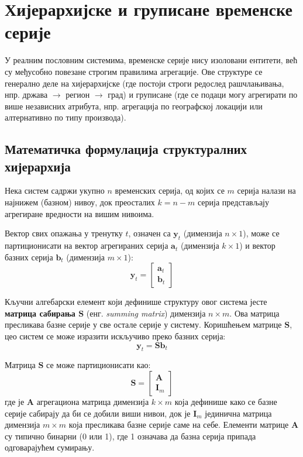 \documentclass[12pt,oneside]{memoir}
\begin{document}
\section{Хијерархијске и груписане временске серије}

У реалним пословним системима, временске серије нису изоловани ентитети, већ су међусобно повезане строгим правилима агрегације. Ове структуре се генерално деле на хијерархијске (где постоји строги редослед рашчлањивања, нпр. држава $\rightarrow$ регион $\rightarrow$ град) и груписане (где се подаци могу агрегирати по више независних атрибута, нпр. агрегација по географској локацији или алтернативно по типу производа).

\subsection{Математичка формулација структуралних хијерархија}

Нека систем садржи укупно $n$ временских серија, од којих се $m$ серија налази на најнижем (базном) нивоу, док преосталих $k = n - m$ серија представљају агрегиране вредности на вишим нивоима. 

Вектор свих опажања у тренутку $t$, означен са $\mathbf{y}_t$ (димензија $n \times 1$), може се партиционисати на вектор агрегираних серија $\mathbf{a}_t$ (димензија $k \times 1$) и вектор базних серија $\mathbf{b}_t$ (димензија $m \times 1$):
\begin{equation}
    \mathbf{y}_t = \begin{bmatrix} \mathbf{a}_t \\ \mathbf{b}_t \end{bmatrix}
\end{equation}

Кључни алгебарски елемент који дефинише структуру овог система јесте \textbf{матрица сабирања $\mathbf{S}$} (енг. \textit{summing matrix}) димензија $n \times m$. Ова матрица пресликава базне серије у све остале серије у систему. Коришћењем матрице $\mathbf{S}$, цео систем се може изразити искључиво преко базних серија:
\begin{equation}
    \mathbf{y}_t = \mathbf{S} \mathbf{b}_t
\end{equation}

Матрица $\mathbf{S}$ се може партиционисати као:
\begin{equation}
    \mathbf{S} = \begin{bmatrix} \mathbf{A} \\ \mathbf{I}_m \end{bmatrix}
\end{equation}
где је $\mathbf{A}$ агрегациона матрица димензија $k \times m$ која дефинише како се базне серије сабирају да би се добили виши нивои, док је $\mathbf{I}_m$ јединична матрица димензија $m \times m$ која пресликава базне серије саме на себе. Елементи матрице $\mathbf{A}$ су типично бинарни (0 или 1), где 1 означава да базна серија припада одговарајућем сумирању.
\end{document}
